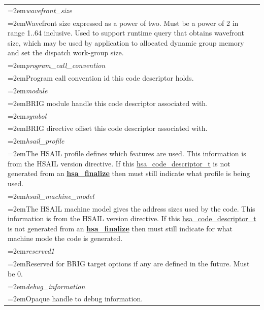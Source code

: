 \documentclass[final]{book}
\newcommand{\reffun}[1]{\textbf{#1}}
\newcommand{\reffld}[1]{\textit{#1}}
\begin{document}
\begin{appendices}
\begin{longtable}{@{}>{\hangindent=2em}p{\textwidth}}
\reffld{wavefront_size}\\\hspace{2em}Wavefront size expressed as a power of two. Must be a power of 2 in range 1..64 inclusive. Used to support runtime query that obtains wavefront size, which may be used by application to allocated dynamic group memory and set the dispatch work-group size.\\[2mm]
\reffld{program_call_convention}\\\hspace{2em}Program call convention id this code descriptor holds.\\[2mm]
\reffld{module}\\\hspace{2em}BRIG module handle this code descriptor associated with.\\[2mm]
\reffld{symbol}\\\hspace{2em}BRIG directive offset this code descriptor associated with.\\[2mm]
\reffld{hsail_profile}\\\hspace{2em}The HSAIL profile defines which features are used. This information is from the HSAIL version directive. If this \hyperlink{group--FinalizerCoreApi-1ga867c6b6dcaa193e321529590eb5df130}{hsa_code_descriptor_t} is not generated from an \hyperlink{group--FinalizerCoreApi-1gaa5d57be415da1b4562e9eee962439b4b}{\reffun{hsa_finalize}} then must still indicate what profile is being used.\\[2mm]
\reffld{hsail_machine_model}\\\hspace{2em}The HSAIL machine model gives the address sizes used by the code. This information is from the HSAIL version directive. If this \hyperlink{group--FinalizerCoreApi-1ga867c6b6dcaa193e321529590eb5df130}{hsa_code_descriptor_t} is not generated from an \hyperlink{group--FinalizerCoreApi-1gaa5d57be415da1b4562e9eee962439b4b}{\reffun{hsa_finalize}} then must still indicate for what machine mode the code is generated.\\[2mm]
\reffld{reserved1}\\\hspace{2em}Reserved for BRIG target options if any are defined in the future. Must be 0.\\[2mm]
\reffld{debug_information}\\\hspace{2em}Opaque handle to debug information.\\[2mm]

\end{longtable}
\end{appendices}
\end{document}

